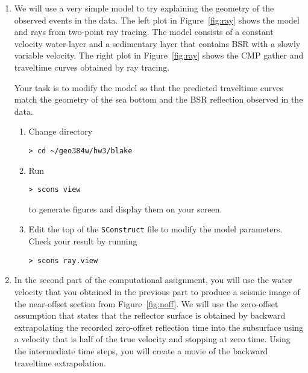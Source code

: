 \begin{enumerate}
\item We will use a very simple model to try explaining the geometry of the
observed events in the data. The left plot in Figure~\ref{fig:ray}
shows the model and rays from two-point ray tracing. The model
consists of a constant velocity water layer and a sedimentary layer
that contains BSR with a slowly variable velocity. The right plot in
Figure~\ref{fig:ray} shows the CMP gather and traveltime curves
obtained by ray tracing.


Your task is to modify the model so that the predicted traveltime
curves match the geometry of the sea bottom and the BSR reflection
observed in the data.

\begin{enumerate}
\item Change directory 
\begin{verbatim}
> cd ~/geo384w/hw3/blake
\end{verbatim}
\item Run
\begin{verbatim}
> scons view
\end{verbatim}
to generate figures and display them on your screen.  
\item Edit the
top of the \texttt{SConstruct} file to modify the model
parameters. Check your result by running
\begin{verbatim}
> scons ray.view
\end{verbatim}
\end{enumerate}

{\small
  }

\item In the second part of the computational assignment, you will use the water velocity that 
you obtained in the previous part to produce a seismic image of the
near-offset section from Figure~\ref{fig:noff}. We will use the
zero-offset assumption that states that the reflector surface is
obtained by backward extrapolating the recorded zero-offset reflection
time into the subsurface using a velocity that is half of the true
velocity and stopping at zero time. Using the intermediate time steps,
you will create a movie of the backward traveltime extrapolation.



\end{enumerate}
